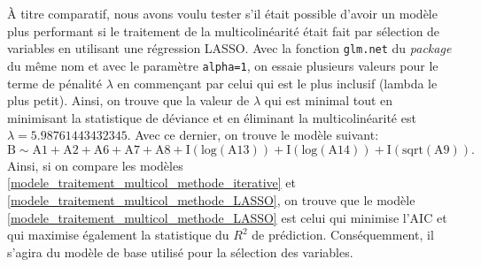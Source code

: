 \documentclass{article}
\begin{document}
	À titre comparatif, nous avons voulu tester s'il était possible d'avoir un modèle plus performant si le traitement de la multicolinéarité était fait par sélection de variables en utilisant une régression LASSO. Avec la fonction \texttt{glm.net} du \textit{package} du même nom et avec le paramètre \texttt{alpha=1}, on essaie plusieurs valeurs pour le terme de pénalité $\lambda$ en commençant par celui qui est le plus inclusif (lambda le plus petit). Ainsi, on trouve que la valeur de $\lambda$ qui est minimal tout en minimisant la statistique de déviance et en éliminant la multicolinéarité est $\lambda = 5.98761443432345.$ Avec ce dernier, on trouve le modèle suivant:
	\begin{equation}\label{modele_traitement_multicol_methode_LASSO}
		\mathrm{B} \sim \mathrm{A1 + A2 + A6 + A7 + A8 + I(log(A13)) + I(log(A14)) + I(sqrt(A9))}.
	\end{equation}
	Ainsi, si on compare les modèles \eqref{modele_traitement_multicol_methode_iterative} et \eqref{modele_traitement_multicol_methode_LASSO}, on trouve que le modèle \eqref{modele_traitement_multicol_methode_LASSO} est celui qui minimise l'AIC et qui maximise également la statistique du $R^2$ de prédiction. Conséquemment, il s'agira du modèle de base utilisé pour la sélection des variables.
	
\end{document}
